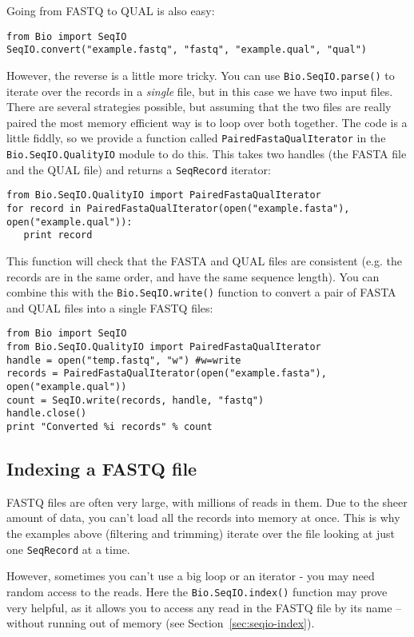 \documentclass{report}
\begin{document}
Going from FASTQ to QUAL is also easy:

\begin{verbatim}
from Bio import SeqIO
SeqIO.convert("example.fastq", "fastq", "example.qual", "qual")
\end{verbatim}

However, the reverse is a little more tricky. You can use \verb|Bio.SeqIO.parse()|
to iterate over the records in a \emph{single} file, but in this case we have
two input files. There are several strategies possible, but assuming that the
two files are really paired the most memory efficient way is to loop over both
together. The code is a little fiddly, so we provide a function called
\verb|PairedFastaQualIterator| in the \verb|Bio.SeqIO.QualityIO| module to do
this. This takes two handles (the FASTA file and the QUAL file) and returns
a \verb|SeqRecord| iterator:

\begin{verbatim}
from Bio.SeqIO.QualityIO import PairedFastaQualIterator
for record in PairedFastaQualIterator(open("example.fasta"), open("example.qual")):
   print record
\end{verbatim}

This function will check that the FASTA and QUAL files are consistent (e.g.
the records are in the same order, and have the same sequence length).
You can combine this with the \verb|Bio.SeqIO.write()| function to convert a
pair of FASTA and QUAL files into a single FASTQ files:

\begin{verbatim}
from Bio import SeqIO
from Bio.SeqIO.QualityIO import PairedFastaQualIterator
handle = open("temp.fastq", "w") #w=write
records = PairedFastaQualIterator(open("example.fasta"), open("example.qual"))
count = SeqIO.write(records, handle, "fastq")
handle.close()
print "Converted %i records" % count
\end{verbatim}

\subsection{Indexing a FASTQ file}
\label{sec:fastq-indexing}

FASTQ files are often very large, with millions of reads in them. Due to the
sheer amount of data, you can't load all the records into memory at once.
This is why the examples above (filtering and trimming) iterate over the file
looking at just one \verb|SeqRecord| at a time.

However, sometimes you can't use a big loop or an iterator - you may need
random access to the reads. Here the \verb|Bio.SeqIO.index()| function
may prove very helpful, as it allows you to access any read in the FASTQ file
by its name -- without running out of memory (see
Section~\ref{sec:seqio-index}).
\end{document}
